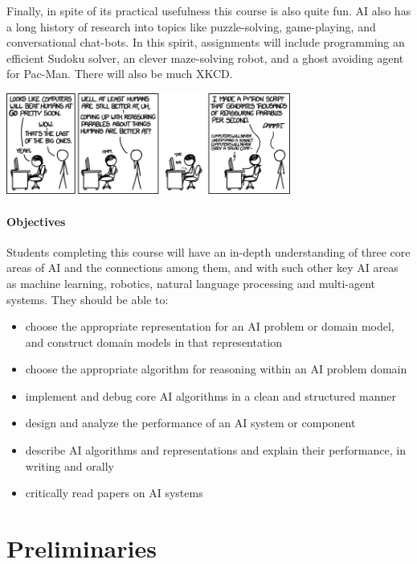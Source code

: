 \documentclass[11pt]{article}
\begin{document}
Finally, in spite of its practical usefulness this course is also
quite fun. AI also has a long history of research into topics like
puzzle-solving, game-playing, and conversational chat-bots. In this
spirit, assignments will include programming an efficient Sudoku
solver, an clever maze-solving robot, and a ghost avoiding agent for
Pac-Man. There will also be much XKCD.


\begin{center}
  \includegraphics[width=0.7\textwidth]{reassuring}
\end{center}

\paragraph{Objectives}

Students completing this course will have an in-depth understanding of
three core areas of AI and the connections among them, and with such
other key AI areas as machine learning, robotics, natural language
processing and multi-agent systems. They should be able to:

\begin{itemize}
\item choose the appropriate representation for an AI problem or
  domain model, and construct domain models in that representation
\item choose the appropriate algorithm for reasoning within an AI
  problem domain
\item implement and debug core AI algorithms in a clean and structured
  manner
\item design and analyze the performance of an AI system
  or component
\item describe AI algorithms and representations and explain their
  performance, in writing and orally
\item critically read papers on AI systems
\end{itemize} 

\section{Preliminaries} 
\end{document}
